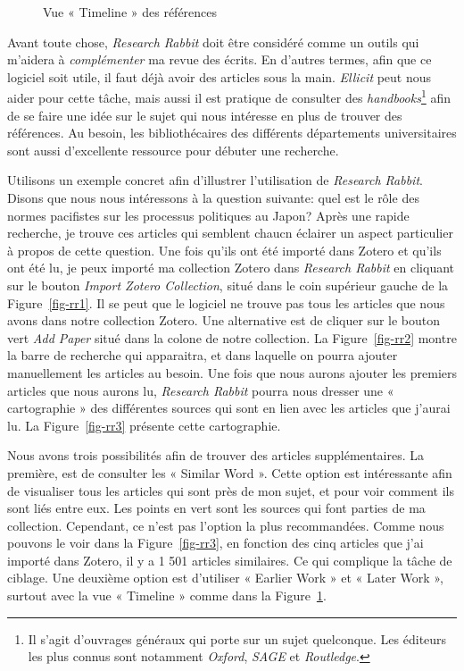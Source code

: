 \documentclass[
  letterpaper,
  DIV=11,
  numbers=noendperiod]{scrreprt}
\begin{document}
\begin{figure}


\caption{\label{fig-rr4}Vue « Timeline » des références}

\end{figure}%

Avant toute chose, \emph{Research Rabbit} doit être considéré comme un
outils qui m'aidera à \emph{complémenter} ma revue des écrits. En
d'autres termes, afin que ce logiciel soit utile, il faut déjà avoir des
articles sous la main. \emph{Ellicit} peut nous aider pour cette tâche,
mais aussi il est pratique de consulter des \emph{handbooks}\footnote{Il
  s'agit d'ouvrages généraux qui porte sur un sujet quelconque. Les
  éditeurs les plus connus sont notamment \emph{Oxford}, \emph{SAGE} et
  \emph{Routledge}.} afin de se faire une idée sur le sujet qui nous
intéresse en plus de trouver des références. Au besoin, les
bibliothécaires des différents départements universitaires sont aussi
d'excellente ressource pour débuter une recherche.

Utilisons un exemple concret afin d'illustrer l'utilisation de
\emph{Research Rabbit}. Disons que nous nous intéressons à la question
suivante: quel est le rôle des normes pacifistes sur les processus
politiques au Japon? Après une rapide recherche, je trouve ces articles
qui semblent chaucn éclairer un aspect particulier à propos de cette
question. Une fois qu'ils ont été importé dans Zotero et qu'ils ont été
lu, je peux importé ma collection Zotero dans \emph{Research Rabbit} en
cliquant sur le bouton \emph{Import Zotero Collection}, situé dans le
coin supérieur gauche de la Figure~\ref{fig-rr1}. Il se peut que le
logiciel ne trouve pas tous les articles que nous avons dans notre
collection Zotero. Une alternative est de cliquer sur le bouton vert
\emph{Add Paper} situé dans la colone de notre collection. La
Figure~\ref{fig-rr2} montre la barre de recherche qui apparaitra, et
dans laquelle on pourra ajouter manuellement les articles au besoin. Une
fois que nous aurons ajouter les premiers articles que nous aurons lu,
\emph{Research Rabbit} pourra nous dresser une « cartographie » des
différentes sources qui sont en lien avec les articles que j'aurai lu.
La Figure~\ref{fig-rr3} présente cette cartographie.

Nous avons trois possibilités afin de trouver des articles
supplémentaires. La première, est de consulter les « Similar Word ».
Cette option est intéressante afin de visualiser tous les articles qui
sont près de mon sujet, et pour voir comment ils sont liés entre eux.
Les points en vert sont les sources qui font parties de ma collection.
Cependant, ce n'est pas l'option la plus recommandées. Comme nous
pouvons le voir dans la Figure~\ref{fig-rr3}, en fonction des cinq
articles que j'ai importé dans Zotero, il y a 1 501 articles similaires.
Ce qui complique la tâche de ciblage. Une deuxième option est d'utiliser
« Earlier Work » et « Later Work », surtout avec la vue « Timeline »
comme dans la Figure~\ref{fig-rr4}.
\end{document}
